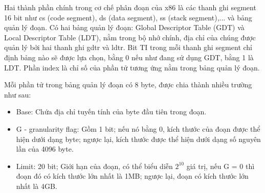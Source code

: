 \documentclass[12pt]{report}
\begin{document}
Hai thành phần chính trong cơ chế phân đoạn của x86 là các thanh ghi segment 16 bit như cs (code segment), ds (data segment), ss (stack segment),... và bảng quản lý đoạn. Có hai bảng quản lý đoạn: Global Descriptor Table (GDT) và Local Descriptor Table (LDT), nằm trong bộ nhớ chính, địa chỉ của chúng được quản lý bởi hai thanh ghi gdtr và ldtr. Bit TI trong mỗi thanh ghi segment chỉ định bảng nào sẽ được lựa chọn, bằng 0 nếu như đang sử dụng GDT, bằng 1 là LDT. Phần index là chỉ số của phần tử tương ứng nằm trong bảng quản lý đoạn. 

Mỗi phần tử trong bảng quản lý đoạn có 8 byte, được chia thành nhiều trường như sau: 
\begin{itemize}
\item Base: Chứa địa chỉ tuyến tính của byte đầu tiên trong đoạn. 
\item G - granularity flag: Gồm 1 bit; nếu nó bằng 0, kích thước của đoạn được thể hiện dưới dạng byte; ngược lại, kích thước được thể hiện dưới dạng số nguyên lần của 4096 byte. 
\item Limit: 20 bit; Giới hạn của đoạn, có thể biểu diễn $2^{10}$ giá trị, nếu G = 0 thì đoạn đó có kích thước lớn nhất là 1MB; ngược lại, đoạn có kích thước lớn nhất là 4GB.
\end{itemize}



\end{document}
